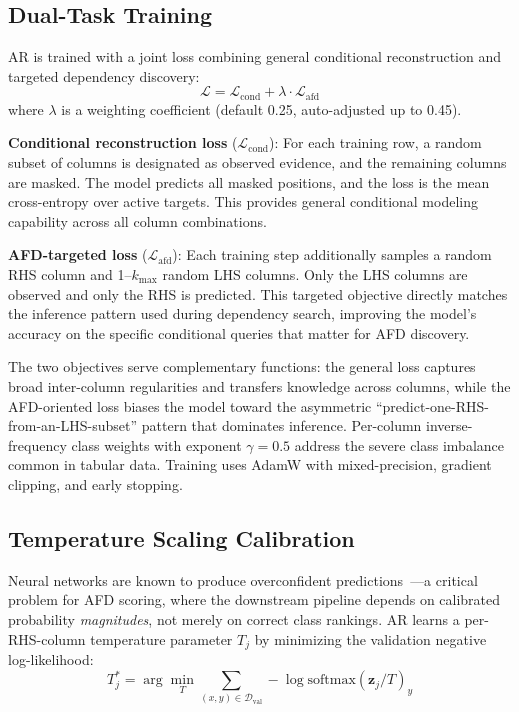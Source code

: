 \documentclass[conference]{IEEEtran}
\begin{document}
\subsection{Dual-Task Training}\label{sec:training}

AR is trained with a joint loss combining general conditional reconstruction and targeted dependency discovery:
\begin{equation}
    \mathcal{L} = \mathcal{L}_{\text{cond}} + \lambda \cdot \mathcal{L}_{\text{afd}}
\end{equation}
where $\lambda$ is a weighting coefficient (default 0.25, auto-adjusted up to 0.45).

\textbf{Conditional reconstruction loss} ($\mathcal{L}_{\text{cond}}$): For each training row, a random subset of columns is designated as observed evidence, and the remaining columns are masked. The model predicts all masked positions, and the loss is the mean cross-entropy over active targets. This provides general conditional modeling capability across all column combinations.

\textbf{AFD-targeted loss} ($\mathcal{L}_{\text{afd}}$): Each training step additionally samples a random RHS column and 1--$k_{\max}$ random LHS columns. Only the LHS columns are observed and only the RHS is predicted. This targeted objective directly matches the inference pattern used during dependency search, improving the model's accuracy on the specific conditional queries that matter for AFD discovery.

The two objectives serve complementary functions: the general loss captures broad inter-column regularities and transfers knowledge across columns, while the AFD-oriented loss biases the model toward the asymmetric ``predict-one-RHS-from-an-LHS-subset'' pattern that dominates inference. Per-column inverse-frequency class weights with exponent $\gamma = 0.5$ address the severe class imbalance common in tabular data. Training uses AdamW with mixed-precision, gradient clipping, and early stopping.

\subsection{Temperature Scaling Calibration}\label{sec:calibration}

Neural networks are known to produce overconfident predictions~\cite{temp_scaling}---a critical problem for AFD scoring, where the downstream pipeline depends on calibrated probability \emph{magnitudes}, not merely on correct class rankings. AR learns a per-RHS-column temperature parameter $T_j$ by minimizing the validation negative log-likelihood:
\begin{equation}
    T_j^* = \arg\min_T \sum_{(x, y) \in \mathcal{D}_{\text{val}}} -\log \text{softmax}(\mathbf{z}_j / T)_y
\end{equation}
\end{document}
